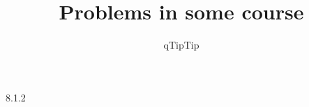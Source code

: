 \documentclass{homework}
\author{qTipTip}
\title{Problems in some course}
\begin{document}
\begin{problem}{7.32}
  \begin{problemtext}
  \blindtext 
  \end{problemtext} 
  \begin{solution}
    \blindmathtrue
    \blindtext
    \blindmathfalse
  \end{solution}
\end{problem}

\begin{problem}{8.1.2}
  \begin{problemtext}
    \blindmathtrue
    \blindtext
    \blindmathfalse
  \end{problemtext}
  \begin{solution}
    \blindtext {}
  \blindtext
  \end{solution} 
\end{problem}

\begin{problem}{3.62}
  \begin{solution}
    \blindtext 
  \end{solution}
\end{problem}
\end{document}
